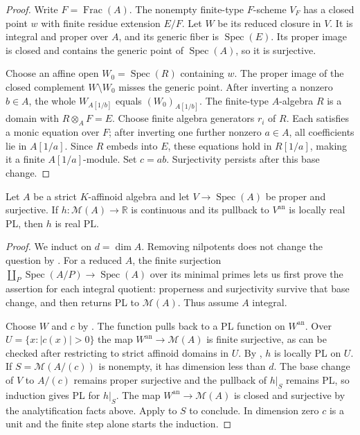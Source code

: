 \documentclass[11pt,a4paper]{amsart}
\begin{document}
\begin{proof}
Write $F=\operatorname{Frac}(A)$. The nonempty finite-type $F$-scheme $V_F$ has a closed point $w$ with finite residue extension $E/F$. Let $W$ be its reduced closure in $V$. It is integral and proper over $A$, and its generic fiber is $\operatorname{Spec}(E)$. Its proper image is closed and contains the generic point of $\operatorname{Spec}(A)$, so it is surjective.

Choose an affine open $W_0=\operatorname{Spec}(R)$ containing $w$. The proper image of the closed complement $W\setminus W_0$ misses the generic point. After inverting a nonzero $b\in A$, the whole $W_{A[1/b]}$ equals $(W_0)_{A[1/b]}$. The finite-type $A$-algebra $R$ is a domain with $R\otimes_A F=E$. Choose finite algebra generators $r_i$ of $R$. Each satisfies a monic equation over $F$; after inverting one further nonzero $a\in A$, all coefficients lie in $A[1/a]$. Since $R$ embeds into $E$, these equations hold in $R[1/a]$, making it a finite $A[1/a]$-module. Set $c=ab$. Surjectivity persists after this base change.
\end{proof}

\begin{proposition}\label{prop:proper-algebraic-descent}
Let $A$ be a strict $K$-affinoid algebra and let $V\to\operatorname{Spec}(A)$ be proper and surjective. If $h:\mathcal M(A)\to\mathbb R$ is continuous and its pullback to $V^{\mathrm{an}}$ is locally real PL, then $h$ is real PL.
\end{proposition}

\begin{proof}
We induct on $d=\dim A$. Removing nilpotents does not change the question by . For a reduced $A$, the finite surjection $\coprod_P\operatorname{Spec}(A/P)\to\operatorname{Spec}(A)$ over its minimal primes lets us first prove the assertion for each integral quotient: properness and surjectivity survive that base change, and  then returns PL to $\mathcal M(A)$. Thus assume $A$ integral.

Choose $W$ and $c$ by . The function pulls back to a PL function on $W^{\mathrm{an}}$. Over $U=\{x:|c(x)|>0\}$ the map $W^{\mathrm{an}}\to\mathcal M(A)$ is finite surjective, as can be checked after restricting to strict affinoid domains in $U$. By , $h$ is locally PL on $U$. If $S=\mathcal M(A/(c))$ is nonempty, it has dimension less than $d$. The base change of $V$ to $A/(c)$ remains proper surjective and the pullback of $h|_S$ remains PL, so induction gives PL for $h|_S$. The map $W^{\mathrm{an}}\to\mathcal M(A)$ is closed and surjective by the analytification facts above. Apply  to $S$ to conclude. In dimension zero $c$ is a unit and the finite step alone starts the induction.
\end{proof}
\end{document}
